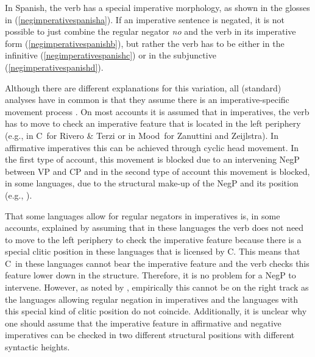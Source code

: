 \noindent In Spanish, the verb has a special imperative morphology, as shown in the glosses in (\ref{negimperativespanisha}). If an imperative sentence is negated, it is not possible to just combine the regular negator \textit{no} and the verb in its imperative form (\ref{negimperativespanishb}), but rather the verb has to be either in the infinitive (\ref{negimperativespanishc}) or in the subjunctive (\ref{negimperativespanishd}). 

Although there are different explanations for this variation, all (standard) analyses have in common is that they assume there is an imperative-specific movement process \citep{zanuttini1991syntactic, rivero1994negation, rivero1995imperatives, platzack1998subject, zeijlstra2004sentential}. On most accounts it is assumed that in imperatives, the verb has to move to check an imperative feature that is located in the left periphery (e.g., in C\textdegree\ for Rivero \& Terzi or in Mood\textdegree\ for Zanuttini and Zeijlstra). In affirmative imperatives this can be achieved through cyclic head movement. In the first type of account, this movement is blocked due to an intervening NegP between VP and CP \citep{rivero1994negation, rivero1995imperatives} and in the second type of account this movement is blocked, in some languages, due to the structural make-up of the NegP and its position (e.g., \citealt{zeijlstra2004sentential}).

That some languages allow for regular negators in imperatives is, in some accounts, explained by assuming that in these languages the verb does not need to move to the left periphery to check the imperative feature because there is a special clitic position in these languages that is licensed by C\textdegree . This means that C\textdegree\ in these languages cannot bear the imperative feature and the verb checks this feature lower down in the structure. Therefore, it is no problem for a NegP to intervene. However, as noted by \citet[62]{van2007imperatives}, empirically this cannot be on the right track as the languages allowing regular negation in imperatives and the languages with this special kind of clitic position do not coincide. Additionally, it is unclear why one should assume that the imperative feature in affirmative and negative imperatives can be checked in two different structural positions with different syntactic heights. 

